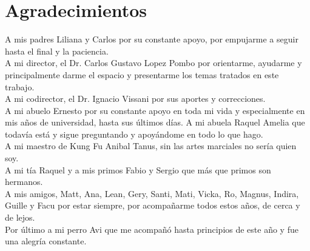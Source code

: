 \chapter*{Agradecimientos}

A mis padres Liliana y Carlos por su constante apoyo, por empujarme a seguir hasta el final y la paciencia.\\
A mi director, el Dr. Carlos Gustavo Lopez Pombo por orientarme, ayudarme y principalmente darme el espacio y presentarme los temas tratados en este trabajo.\\
A mi codirector, el Dr. Ignacio Vissani por sus aportes y correcciones.\\
A mi abuelo Ernesto por su constante apoyo en toda mi vida y especialmente en mis años de universidad, hasta sus últimos días. A mi abuela Raquel Amelia que todavía está y sigue preguntando y apoyándome en todo lo que hago.\\
A mi maestro de Kung Fu Anibal Tanus, sin las artes marciales no sería quien soy.\\
A mi tía Raquel y a mis primos Fabio y Sergio que más que primos son hermanos. \\
A mis amigos, Matt, Ana, Lean, Gery, Santi, Mati, Vicka, Ro, Magnus, Indira, Guille y Facu por estar siempre, por acompañarme todos estos años, de cerca y de lejos.\\
Por último a mi perro Avi que me acompañó hasta principios de este año y fue una alegría constante.